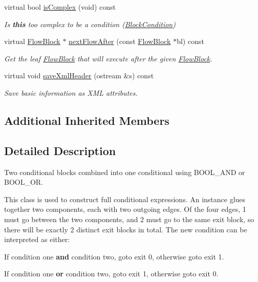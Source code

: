 \begin{DoxyCompactItemize}
virtual bool \mbox{\hyperlink{class_block_condition_a38493adfe801b32d82244de3ee75c6fc}{is\+Complex}} (void) const
\begin{DoxyCompactList}\small\item\em Is {\bfseries{this}} too complex to be a condition (\mbox{\hyperlink{class_block_condition}{Block\+Condition}}) \end{DoxyCompactList}\item 
virtual \mbox{\hyperlink{class_flow_block}{Flow\+Block}} $\ast$ \mbox{\hyperlink{class_block_condition_aefdc0e19b1623ebefa07b05b5bd85408}{next\+Flow\+After}} (const \mbox{\hyperlink{class_flow_block}{Flow\+Block}} $\ast$bl) const
\begin{DoxyCompactList}\small\item\em Get the leaf \mbox{\hyperlink{class_flow_block}{Flow\+Block}} that will execute after the given \mbox{\hyperlink{class_flow_block}{Flow\+Block}}. \end{DoxyCompactList}\item 
virtual void \mbox{\hyperlink{class_block_condition_a1e24ce75951cb7a66b281eeabe7854c0}{save\+Xml\+Header}} (ostream \&s) const
\begin{DoxyCompactList}\small\item\em Save basic information as X\+ML attributes. \end{DoxyCompactList}\end{DoxyCompactItemize}
\subsection*{Additional Inherited Members}


\subsection{Detailed Description}
Two conditional blocks combined into one conditional using B\+O\+O\+L\+\_\+\+A\+ND or B\+O\+O\+L\+\_\+\+OR. 

This class is used to construct full conditional expressions. An instance glues together two components, each with two outgoing edges. Of the four edges, 1 must go between the two components, and 2 must go to the same exit block, so there will be exactly 2 distinct exit blocks in total. The new condition can be interpreted as either\+:
\begin{DoxyItemize}
\item If condition one {\bfseries{and}} condition two, goto exit 0, otherwise goto exit 1.
\item If condition one {\bfseries{or}} condition two, goto exit 1, otherwise goto exit 0.
\end{DoxyItemize}

